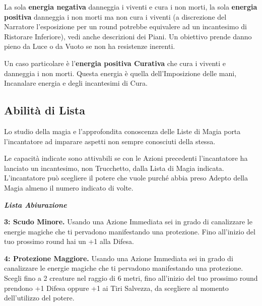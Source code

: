 \begin{multicols}{2}
La sola \textbf{energia negativa} danneggia i viventi e cura i non morti, la sola \textbf{energia positiva} danneggia i non morti ma non cura i viventi (a discrezione del Narratore l'esposizione per un round potrebbe equivalere ad un incantesimo di Ristorare Inferiore), vedi anche descrizioni dei Piani. Un obiettivo prende danno pieno da Luce o da Vuoto se non ha resistenze inerenti.

Un caso particolare è l'\textbf{energia positiva Curativa} che cura i viventi e danneggia i non morti. Questa energia è quella dell'Imposizione delle mani, Incanalare energia e degli incantesimi di Cura.

\subsection{Abilità di Lista}\label{abilitadilista}\hypertarget{abilitadilista}{}


Lo studio della magia e l'approfondita conoscenza delle Liste di Magia porta l'incantatore ad imparare aspetti non sempre conosciuti della stessa.

Le capacità indicate sono attivabili se con le Azioni precedenti l'incantatore ha lanciato un incantesimo, non Trucchetto, dalla Lista di Magia indicata. L'incantatore può scegliere il potere che vuole purché abbia preso Adepto della Magia almeno il numero indicato di volte.

\emph{\textbf{Lista Abiurazione}}

\textbf{3: Scudo Minore.} Usando una Azione Immediata sei in grado di canalizzare le energie magiche che ti pervadono manifestando una protezione. Fino all'inizio del tuo prossimo round hai un +1 alla Difesa.

\textbf{4: Protezione Maggiore.} Usando una Azione Immediata sei in grado di canalizzare le energie magiche che ti pervadono manifestando una protezione. Scegli fino a 2 creature nel raggio di 6 metri, fino all'inizio del tuo prossimo round prendono +1 Difesa oppure +1 ai Tiri Salvezza, da scegliere al momento dell'utilizzo del potere.


\end{multicols}
